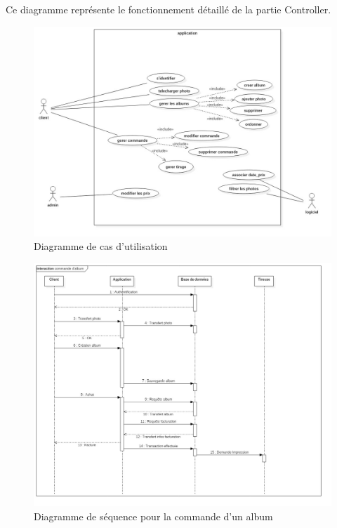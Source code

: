 \documentclass{article}
\begin{document}
\begin{flushleft}
Ce diagramme représente le fonctionnement détaillé de la partie Controller.
\vspace{1\baselineskip}
\begin{figure}[!h]
  \begin{center}
    \includegraphics[scale=0.40]{fig7} %
    \caption{Diagramme de cas d'utilisation}
  \end{center}
\end{figure}

\vspace{1\baselineskip}
\begin{figure}[!h]
  \begin{center}
    \includegraphics[scale=0.40]{fig8} %
    \caption{Diagramme de séquence pour la commande d'un album}
  \end{center}
\end{figure}




\end{flushleft}
\end{document}
